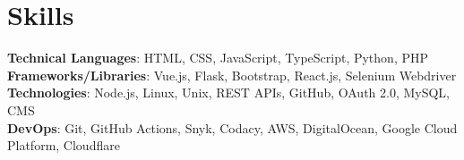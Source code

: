 \section{Skills}
 \begin{itemize}[leftmargin=0.15in, label={}]
    \small{\item{
     \textbf{Technical Languages}{: HTML, CSS, JavaScript, TypeScript, Python, PHP} \\
     \textbf{Frameworks/Libraries}{: Vue.js, Flask, Bootstrap, React.js, Selenium Webdriver} \\
     \textbf{Technologies}{: Node.js, Linux, Unix, REST APIs, GitHub, OAuth 2.0, MySQL, CMS } \\
     \textbf{DevOps}{: Git, GitHub Actions, Snyk, Codacy, AWS, DigitalOcean, Google Cloud Platform, Cloudflare }
    }}
 \end{itemize}  